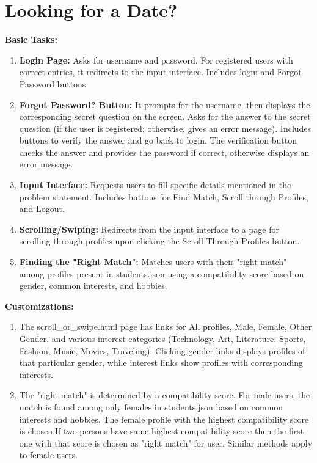 \documentclass{article}
\begin{document}
\section*{Looking for a Date?}

\textbf{Basic Tasks:}

\begin{enumerate}
    \item \textbf{Login Page:} Asks for username and password. For registered users with correct entries, it redirects to the input interface. Includes login and Forgot Password buttons.
    
    \item \textbf{Forgot Password? Button:} It prompts for the username, then displays the corresponding secret question on the screen. Asks for the answer to the secret question (if the user is registered; otherwise, gives an error message). Includes buttons to verify the answer and go back to login. The verification button checks the answer and provides the password if correct, otherwise displays an error message.
    
    \item \textbf{Input Interface:} Requests users to fill specific details mentioned in the problem statement. Includes buttons for Find Match, Scroll through Profiles, and Logout.
    
    \item \textbf{Scrolling/Swiping:} Redirects from the input interface to a page for scrolling through profiles upon clicking the Scroll Through Profiles button.
    
    \item \textbf{Finding the "Right Match":} Matches users with their "right match" among profiles present in students.json using a compatibility score based on gender, common interests, and hobbies.
\end{enumerate}

\textbf{Customizations:}

\begin{enumerate}
    \item The scroll_or_swipe.html page has links for All profiles, Male, Female, Other Gender, and various interest categories (Technology, Art, Literature, Sports, Fashion, Music, Movies, Traveling). Clicking gender links displays profiles of that particular gender, while interest links show profiles with corresponding interests.
    
    \item The "right match" is determined by a compatibility score. For male users, the match is found among only females in students.json based on common interests and hobbies. The female profile with the highest compatibility score is chosen.If two persons have same highest compatibility score then the first one with that score is chosen as "right match" for user.  Similar methods apply to female users.
\end{enumerate}
\end{document}
